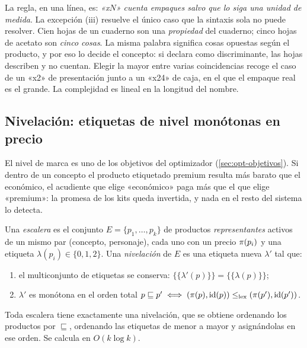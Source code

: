 La regla, en una línea, es: \emph{«x$N$» cuenta empaques salvo que lo siga
una unidad de medida}. La excepción (iii) resuelve el único caso que la
sintaxis sola no puede resolver. Cien hojas de un cuaderno son una
\emph{propiedad} del cuaderno; cinco hojas de acetato son \emph{cinco cosas}.
La misma palabra significa cosas opuestas según el producto, y por eso lo
decide el concepto: si declara  como discriminante, las hojas
describen y no cuentan. Elegir la mayor entre varias coincidencias recoge el
caso de un «x2» de presentación junto a un «x24» de caja, en el que el
empaque real es el grande. La complejidad es lineal en la longitud del nombre.

\subsection{Nivelación: etiquetas de nivel monótonas en precio}
\label{sec:cat-nivelar}

El nivel de marca es uno de los objetivos del optimizador
(\cref{sec:opt-objetivos}). Si dentro de un concepto el producto etiquetado
premium resulta más barato que el económico, el acudiente que elige
«económico» paga más que el que elige «premium»: la promesa de los kits queda
invertida, y nada en el resto del sistema lo detecta.

\begin{definicion}
Una \emph{escalera} es el conjunto $E=\{p_1,\dots,p_k\}$ de productos
\emph{representantes} activos de un mismo par (concepto, personaje), cada uno
con un precio $\pi(p_i)$ y una etiqueta $\lambda(p_i)\in\{0,1,2\}$. Una
\emph{nivelación} de $E$ es una etiqueta nueva $\lambda'$ tal que:
\begin{enumerate}[label=(N\arabic*)]
  \item\label{niv:multi} el multiconjunto de etiquetas se conserva:
        $\{\!\{\lambda'(p)\}\!\}=\{\!\{\lambda(p)\}\!\}$;
  \item\label{niv:mono} $\lambda'$ es monótona en el orden total
        $p\sqsubseteq p'\iff(\pi(p),\mathrm{id}(p))\leq_{\mathrm{lex}}(\pi(p'),\mathrm{id}(p'))$.
\end{enumerate}
\end{definicion}

\begin{proposicion}
\label{prop:nivelar}
Toda escalera tiene exactamente una nivelación, que se obtiene ordenando los
productos por $\sqsubseteq$, ordenando las etiquetas de menor a mayor y
asignándolas en ese orden. Se calcula en $O(k\log k)$.
\end{proposicion}

